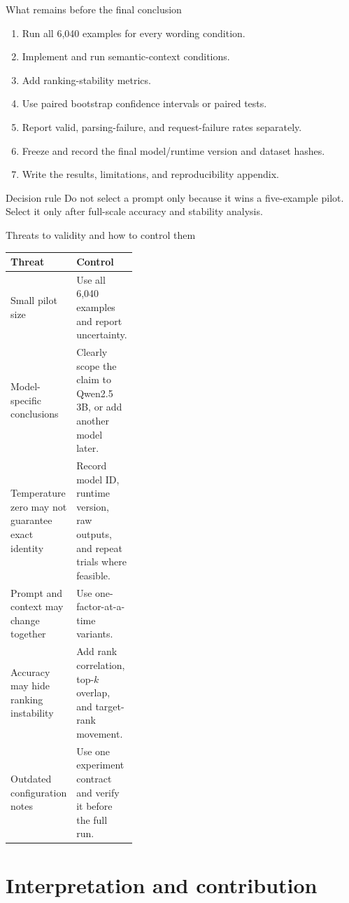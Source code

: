 \documentclass[aspectratio=169,12pt]{beamer}
\begin{document}
\begin{frame}{What remains before the final conclusion}
\begin{enumerate}
  \item Run all 6,040 examples for every wording condition.
  \item Implement and run semantic-context conditions.
  \item Add ranking-stability metrics.
  \item Use paired bootstrap confidence intervals or paired tests.
  \item Report valid, parsing-failure, and request-failure rates separately.
  \item Freeze and record the final model/runtime version and dataset hashes.
  \item Write the results, limitations, and reproducibility appendix.
\end{enumerate}

\begin{block}{Decision rule}
Do not select a prompt only because it wins a five-example pilot. Select it
only after full-scale accuracy and stability analysis.
\end{block}
\end{frame}

\begin{frame}{Threats to validity and how to control them}
\begin{tabularx}{\linewidth}{@{}p{0.36\linewidth}X@{}}
\toprule
\textbf{Threat} & \textbf{Control}\\
\midrule
Small pilot size &
Use all 6,040 examples and report uncertainty.\\
Model-specific conclusions &
Clearly scope the claim to Qwen2.5 3B, or add another model later.\\
Temperature zero may not guarantee exact identity &
Record model ID, runtime version, raw outputs, and repeat trials where feasible.\\
Prompt and context may change together &
Use one-factor-at-a-time variants.\\
Accuracy may hide ranking instability &
Add rank correlation, top-$k$ overlap, and target-rank movement.\\
Outdated configuration notes &
Use one experiment contract and verify it before the full run.\\
\bottomrule
\end{tabularx}
\end{frame}

\section{Interpretation and contribution}
\end{document}
